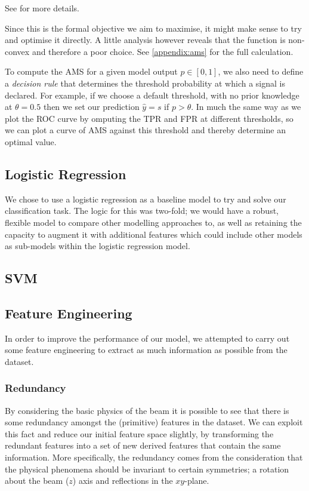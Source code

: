 See \cite{HiggsML} for more details.

Since this is the formal objective we aim to maximise, it might make sense to try and optimise it directly. A little analysis however reveals that the function is non-convex and therefore a poor choice. See \ref{appendix:ams} for the full calculation.

To compute the AMS for a given model output $p \in [0,1]$, we also need to define a \emph{decision rule} that determines the threshold probability at which a signal is declared. For example, if we choose a default threshold, with no prior knowledge at $\theta = 0.5$ then we set our prediction $\hat{y} = s$ if $p > \theta$. In much the same way as we plot the ROC curve by omputing the TPR and FPR at different thresholds, so we can plot a curve of AMS against this threshold and thereby determine an optimal value. 

\subsection{Logistic Regression}
We chose to use a logistic regression as a baseline model to try and solve our classification task. The logic for this was two-fold; we would have a robust, flexible model to compare other modelling approaches to, as well as retaining the capacity to augment it with additional features which could include other models as sub-models within the logistic regression model. 

\subsection{SVM}

\subsection{Feature Engineering}
In order to improve the performance of our model, we attempted to carry out some feature engineering to extract as much information as possible from the dataset.

\subsubsection{Redundancy}
By considering the basic physics of the beam it is possible to see that there is some redundancy amongst the (primitive) features in the dataset. We can exploit this fact and reduce our initial feature space slightly, by transforming the redundant features into a set of new derived features that contain the same information. 
More specifically, the redundancy comes from the consideration that the physical phenomena should be invariant to certain symmetries; a rotation about the beam ($z$) axis and reflections in the $xy$-plane.

